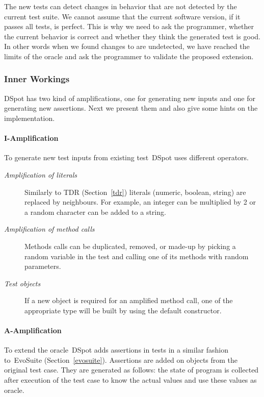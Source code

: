 \documentclass[11pt]{sdm}
\newcommand{\dspot}{DSpot\xspace}
\newcommand{\evosuite}{EvoSuite\xspace}
\begin{document}
The new tests can detect changes in behavior that are not detected by the current test suite.
We cannot assume that the current software version, if it passes all tests, is perfect.
This is why we need to ask the programmer, whether the current behavior is correct and whether they think the generated test is good.
In other words when we found changes to are undetected, we have reached the limits of the oracle and ask the programmer to validate the proposed extension.

\subsubsection{Inner Workings}
\dspot{} has two kind of amplifications, one for generating new inputs and one for generating new assertions.
Next we present them and also give some hints on the implementation.

\paragraph{I-Amplification}
To generate new test inputs from existing test~\dspot{} uses different operators.
\begin{description}
  \item[\textit{Amplification of literals}] Similarly to TDR (Section~\ref{tdr}) literals (numeric, boolean, string) are replaced by neighbours. For example, an integer can be multiplied by 2 or a random character can be added to a string.
  \item[\textit{Amplification of method calls}] Methods calls can be duplicated, removed, or made-up by picking a random variable in the test and calling one of its methods with random parameters.
  \item[\textit{Test objects}] If a new object is required for an amplified method call, one of the appropriate type will be built by using the default constructor.
\end{description}

\paragraph{A-Amplification}
To extend the oracle~\dspot{} adds assertions in tests in a similar fashion to~\evosuite{} (Section~\ref{evosuite}).
Assertions are added on objects from the original test case.
They are generated as follows: the state of program is collected after execution of the test case to know the actual values and use these values as oracle.
\end{document}

